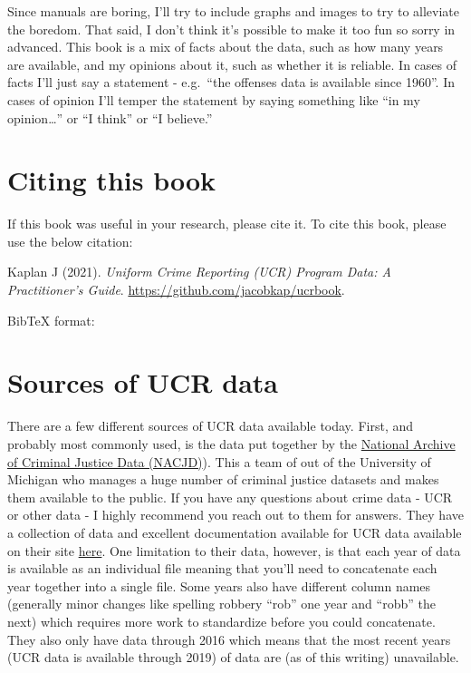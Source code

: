 \documentclass[
  12pt,
  openany]{book}
\begin{document}
Since manuals are boring, I'll try to include graphs and images to try to alleviate the boredom. That said, I don't think it's possible to make it too fun so sorry in advanced. This book is a mix of facts about the data, such as how many years are available, and my opinions about it, such as whether it is reliable. In cases of facts I'll just say a statement - e.g.~``the offenses data is available since 1960''. In cases of opinion I'll temper the statement by saying something like ``in my opinion\ldots{}'' or ``I think'' or ``I believe.''

\hypertarget{citing-this-book}{%
\section{Citing this book}\label{citing-this-book}}

If this book was useful in your research, please cite it. To cite this book, please use the below citation:

Kaplan J (2021). \emph{Uniform Crime Reporting (UCR) Program Data: A Practitioner's Guide}. \url{https://github.com/jacobkap/ucrbook}.

BibTeX format:

\hypertarget{sources-of-ucr-data}{%
\section{Sources of UCR data}\label{sources-of-ucr-data}}

There are a few different sources of UCR data available today. First, and probably most commonly used, is the data put together by the \href{https://www.icpsr.umich.edu/web/pages/NACJD/index.html}{National Archive of Criminal Justice Data (NACJD)}). This a team of out of the University of Michigan who manages a huge number of criminal justice datasets and makes them available to the public. If you have any questions about crime data - UCR or other data - I highly recommend you reach out to them for answers. They have a collection of data and excellent documentation available for UCR data available on their site \href{https://www.icpsr.umich.edu/web/NACJD/series/57}{here}. One limitation to their data, however, is that each year of data is available as an individual file meaning that you'll need to concatenate each year together into a single file. Some years also have different column names (generally minor changes like spelling robbery ``rob'' one year and ``robb'' the next) which requires more work to standardize before you could concatenate. They also only have data through 2016 which means that the most recent years (UCR data is available through 2019) of data are (as of this writing) unavailable.
\end{document}
